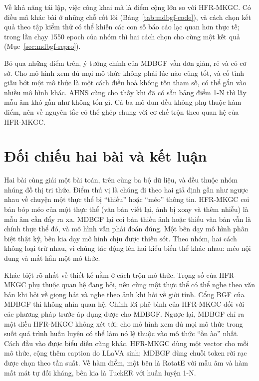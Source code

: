 \documentclass[conference,a4paper]{IEEEtran}
\begin{document}
Về khả năng tái lập, việc công khai mã là điểm cộng lớn so với HFR-MKGC. Có điều mã khác bài ở những chỗ cốt lõi (Bảng~\ref{tab:mdbgf-code}), và cách chọn kết quả theo tập kiểm thử có thể khiến các con số báo cáo lạc quan hơn thực tế; trong lần chạy 1550 epoch của nhóm thì hai cách chọn cho cùng một kết quả (Mục~\ref{sec:mdbgf-repro}).

Bỏ qua những điểm trên, ý tưởng chính của MDBGF vẫn đơn giản, rẻ và có cơ sở. Cho mô hình xem đủ mọi mô thức không phải lúc nào cũng tốt, và cố tình giấu bớt một mô thức là một cách điều hoà không tốn tham số, có thể gắn vào nhiều mô hình khác. AHNS cũng cho thấy khi đã có sẵn bảng điểm 1-N thì lấy mẫu âm khó gần như không tốn gì. Cả ba mô-đun đều không phụ thuộc hàm điểm, nên về nguyên tắc có thể ghép chung với cơ chế trộn theo quan hệ của HFR-MKGC.

\section{Đối chiếu hai bài và kết luận}
\label{sec:compare}

Hai bài cùng giải một bài toán, trên cùng ba bộ dữ liệu, và đều thuộc nhóm nhúng đồ thị tri thức. Điểm thú vị là chúng đi theo hai giả định gần như ngược nhau về chuyện một thực thể bị ``thiếu'' hoặc ``méo'' thông tin. HFR-MKGC coi bản bóp méo của một thực thể (văn bản viết lại, ảnh bị xoay và thêm nhiễu) là mẫu âm cần đẩy ra xa. MDBGF lại coi bản thiếu ảnh hoặc thiếu văn bản vẫn là chính thực thể đó, và mô hình vẫn phải đoán đúng. Một bên dạy mô hình phân biệt thật kỹ, bên kia dạy mô hình chịu được thiếu sót. Theo nhóm, hai cách không loại trừ nhau, vì chúng tác động lên hai kiểu biến thể khác nhau: méo nội dung và mất hẳn một mô thức.

Khác biệt rõ nhất về thiết kế nằm ở cách trộn mô thức. Trọng số của HFR-MKGC phụ thuộc quan hệ đang hỏi, nên cùng một thực thể có thể nghe theo văn bản khi hỏi về giọng hát và nghe theo ảnh khi hỏi về giới tính. Cổng BGF của MDBGF thì không nhìn quan hệ. Chính lời phê bình của HFR-MKGC đối với các phương pháp trước áp dụng được cho MDBGF. Ngược lại, MDBGF chỉ ra một điều HFR-MKGC không xét tới: cho mô hình xem đủ mọi mô thức trong suốt quá trình huấn luyện có thể làm nó lệ thuộc vào mô thức ``ồn ào'' nhất. Cách đầu vào được biểu diễn cũng khác. HFR-MKGC dùng một vector cho mỗi mô thức, cộng thêm caption do LLaVA sinh; MDBGF dùng chuỗi token rời rạc được chọn theo tần suất. Về hàm điểm, một bên là RotatE với mẫu âm và hàm mất mát tự đối kháng, bên kia là TuckER với huấn luyện 1-N.
\end{document}
